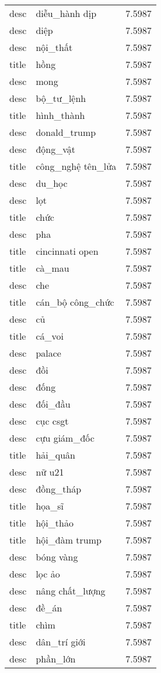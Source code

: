 \documentclass{article}
\begin{document}
\begin{tabular}{lll}
desc & diễu\_hành dịp & 7.5987\\
desc & diệp & 7.5987\\
desc & nội\_thất & 7.5987\\
title & hồng & 7.5987\\
desc & mong & 7.5987\\
desc & bộ\_tư\_lệnh & 7.5987\\
title & hình\_thành & 7.5987\\
desc & donald\_trump & 7.5987\\
desc & động\_vật & 7.5987\\
title & công\_nghệ tên\_lửa & 7.5987\\
desc & du\_học & 7.5987\\
desc & lọt & 7.5987\\
title & chức & 7.5987\\
desc & pha & 7.5987\\
title & cincinnati open & 7.5987\\
title & cà\_mau & 7.5987\\
desc & che & 7.5987\\
title & cán\_bộ công\_chức & 7.5987\\
desc & củ & 7.5987\\
title & cá\_voi & 7.5987\\
desc & palace & 7.5987\\
desc & đồi & 7.5987\\
desc & đống & 7.5987\\
desc & đối\_đầu & 7.5987\\
desc & cục csgt & 7.5987\\
desc & cựu giám\_đốc & 7.5987\\
title & hải\_quân & 7.5987\\
desc & nữ u21 & 7.5987\\
desc & đồng\_tháp & 7.5987\\
title & họa\_sĩ & 7.5987\\
title & hội\_thảo & 7.5987\\
title & hội\_đàm trump & 7.5987\\
desc & bóng vàng & 7.5987\\
desc & lọc ảo & 7.5987\\
desc & nâng chất\_lượng & 7.5987\\
desc & đề\_án & 7.5987\\
title & chìm & 7.5987\\
desc & dân\_trí giới & 7.5987\\
desc & phần\_lớn & 7.5987\\

\end{tabular}
\end{document}
